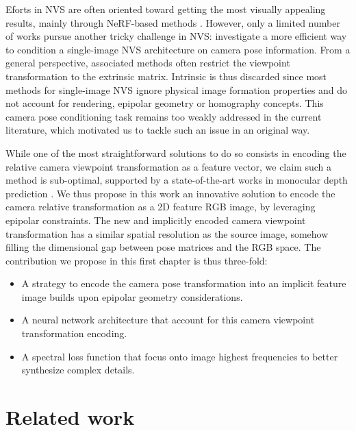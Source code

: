 Eforts in \ac{NVS} are often oriented toward getting the most visually appealing results, mainly through \ac{NeRF}-based methods \citep{mildenhall2020nerf,wang2021neus,barron2021mip,barron2022mip}. However, only a limited number of works pursue another tricky challenge in \ac{NVS}: investigate a more efficient way to condition a single-image \ac{NVS} architecture on camera pose information. From a general perspective, associated methods often restrict the viewpoint transformation to the extrinsic matrix. Intrinsic is thus discarded since most methods for single-image \ac{NVS} ignore physical image formation properties and do not account for rendering, epipolar geometry or homography concepts. This camera pose conditioning task remains too weakly addressed in the current literature, which motivated us to tackle such an issue in an original way.

While one of the most straightforward solutions to do so consists in encoding the relative camera viewpoint transformation as a feature vector, we claim such a method is sub-optimal, supported by a state-of-the-art works in monocular depth prediction \citep{zhao2021camera}. We thus propose in this work an innovative solution to encode the camera relative transformation as a 2D feature RGB image, by leveraging epipolar constraints. The new and implicitly encoded camera viewpoint transformation has a similar spatial resolution as the source image, somehow filling the dimensional gap between pose matrices and the RGB space. The contribution we propose in this first chapter is thus three-fold: 
\begin{itemize}
	\item A strategy to encode the camera pose transformation into an implicit feature image builds upon epipolar geometry considerations. 
	\item A neural network architecture that account for this camera viewpoint transformation encoding. 
	\item A spectral loss function that focus onto image highest frequencies to better synthesize complex details.
\end{itemize}

\section{Related work}

